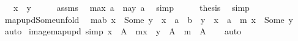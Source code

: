 \begin{isabellebody}
\ \ \ {\isachardoublequoteopen}x\ {\isacharequal}{\kern0pt}\ y{\isachardoublequoteclose}\isanewline
%
\isadelimproof
%
\endisadelimproof
%
\isatagproof
{}\isamarkupfalse%
\ {\isacharminus}{\kern0pt}\isanewline
\ \ \isamarkupfalse%
\ assms\ \isamarkupfalse%
\ {\isachardoublequoteopen}{\isacharparenleft}{\kern0pt}m{\isacharparenleft}{\kern0pt}a{\isasymmapsto}x{\isacharparenright}{\kern0pt}{\isacharparenright}{\kern0pt}\ a\ {\isacharequal}{\kern0pt}\ {\isacharparenleft}{\kern0pt}n{\isacharparenleft}{\kern0pt}a{\isasymmapsto}y{\isacharparenright}{\kern0pt}{\isacharparenright}{\kern0pt}\ a{\isachardoublequoteclose}\ \isamarkupfalse%
\ simp\isanewline
\ \ \isamarkupfalse%
\ \isamarkupfalse%
\ {\isacharquery}{\kern0pt}thesis\ \isamarkupfalse%
\ simp\isanewline
{}\isamarkupfalse%
%
\endisatagproof
{\isafoldproof}%
%
\isadelimproof
\isanewline
%
\endisadelimproof
\isanewline
{}\isamarkupfalse%
\ map{\isacharunderscore}{\kern0pt}upd{\isacharunderscore}{\kern0pt}Some{\isacharunderscore}{\kern0pt}unfold{\isacharcolon}{\kern0pt}\isanewline
\ \ {\isachardoublequoteopen}{\isacharparenleft}{\kern0pt}{\isacharparenleft}{\kern0pt}m{\isacharparenleft}{\kern0pt}a{\isasymmapsto}b{\isacharparenright}{\kern0pt}{\isacharparenright}{\kern0pt}\ x\ {\isacharequal}{\kern0pt}\ Some\ y{\isacharparenright}{\kern0pt}\ {\isacharequal}{\kern0pt}\ {\isacharparenleft}{\kern0pt}x\ {\isacharequal}{\kern0pt}\ a\ {\isasymand}\ b\ {\isacharequal}{\kern0pt}\ y\ {\isasymor}\ x\ {\isasymnoteq}\ a\ {\isasymand}\ m\ x\ {\isacharequal}{\kern0pt}\ Some\ y{\isacharparenright}{\kern0pt}{\isachardoublequoteclose}\isanewline
%
\isadelimproof
\ \ %
\endisadelimproof
%
\isatagproof
{}\isamarkupfalse%
\ auto%
\endisatagproof
{\isafoldproof}%
%
\isadelimproof
\isanewline
%
\endisadelimproof
\isanewline
{}\isamarkupfalse%
\ image{\isacharunderscore}{\kern0pt}map{\isacharunderscore}{\kern0pt}upd\ {\isacharbrackleft}{\kern0pt}simp{\isacharbrackright}{\kern0pt}{\isacharcolon}{\kern0pt}\ {\isachardoublequoteopen}x\ {\isasymnotin}\ A\ {\isasymLongrightarrow}\ m{\isacharparenleft}{\kern0pt}x\ {\isasymmapsto}\ y{\isacharparenright}{\kern0pt}\ {\isacharbackquote}{\kern0pt}\ A\ {\isacharequal}{\kern0pt}\ m\ {\isacharbackquote}{\kern0pt}\ A{\isachardoublequoteclose}\isanewline
%
\isadelimproof
\ \ %
\endisadelimproof
%
\isatagproof
{}\isamarkupfalse%
\ auto%
\endisatagproof
{\isafoldproof}%
%
\isadelimproof
\isanewline

\end{isabellebody}
